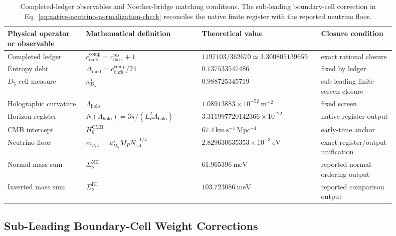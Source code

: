 \documentclass[11pt,letterpaper]{article}
\theoremstyle{plain}
\newcommand{\cdarkres}{c_{\text{dark}}^{\text{res}}}
\newcommand{\cdarkcomp}{c_{\text{dark}}^{\text{comp}}}
\newcommand{\Lholo}{\Lambda_{\text{holo}}}
\newcommand{\Nsat}{N_{\text{sat}}}
\newcommand{\Lp}{L_P}
\newcommand{\kmsmpc}{\mathrm{km\,s^{-1}\,Mpc^{-1}}}
\newcommand{\DeltaMod}{\Delta_{\text{mod}}}
\newcommand{\kappad}{\kappa_{D_5}}
\begin{document}
\begin{table}[htbp]
\centering
\scriptsize
\begin{tabular}{@{}L{0.19\linewidth}L{0.28\linewidth}L{0.25\linewidth}L{0.18\linewidth}@{}}
\toprule
Physical operator or observable & Mathematical definition & Theoretical value & Closure condition \\
\midrule
Completed ledger & $\cdarkcomp=\cdarkres+1$ & $1197103/362670\simeq3.300805139659$ & exact rational closure \\
Entropy debt & $\DeltaMod=\cdarkcomp/24$ & $0.137533547486$ & fixed by ledger \\
$D_5$ cell measure & $\kappad^\star$ & $0.988725345719$ & sub-leading finite-screen closure \\
Holographic curvature & $\Lholo$ & $1.08913883\times10^{-52}\ \mathrm{m}^{-2}$ & fixed screen \\
Horizon register & $N(\Lholo)=3\pi/(\Lp^2\Lholo)$ & $3.311997720142366\times10^{122}$ & native register output \\
CMB intercept & $H_0^{\text{CMB}}$ & $67.4\,\kmsmpc$ & early-time anchor \\
Neutrino floor & $m_{\nu,1}=\kappad^\star M_P\Nsat^{-1/4}$ & $2.829630635353\times10^{-3}\ \mathrm{eV}$ & exact register/output unification \\
Normal mass sum & $\Sigma_{\nu}^{\text{NH}}$ & $61.965396\ \mathrm{meV}$ & reported normal-ordering output \\
Inverted mass sum & $\Sigma_{\nu}^{\text{IH}}$ & $103.723086\ \mathrm{meV}$ & reported comparison output \\
\bottomrule
\end{tabular}
\caption{Completed-ledger observables and Noether-bridge matching conditions.
The sub-leading boundary-cell correction in
Eq.~\eqref{eq:native-neutrino-normalization-check} reconciles the native
finite register with the reported neutrino floor.}
\label{tab:noether-bridge-audit}
\end{table}

\subsection{Sub-Leading Boundary-Cell Weight Corrections}
\label{sec:subleading-boundary-cell-weights}
\end{document}
